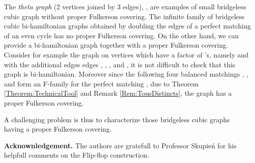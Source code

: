 \documentclass{amsart}
\theoremstyle{definition}
\theoremstyle{remark}
\begin{document}
The {\em theta graph }(2 vertices joined by 3 edges), ,
 are examples of small bridgeless cubic graph without
proper Fulkerson covering. The infinite family of bridgeless cubic
bi-hamiltonian graphs obtained by doubling the edges of a perfect matching of an
even cycle has no proper Fulkerson covering.
On the other hand, we can provide a bi-hamiltonian graph together with a proper
Fulkerson covering. Consider for example the graph  on  vertices which
have a  factor of 's, namely  and  with the additional
edges edges , , ,  and , it is not difficult to check that
this graph is bi-hamiltonian. Moreover since the following four balanced
matchings , ,  and  form an F-family for the
perfect matching , due to Theorem
\ref{Theorem:TechnicalTool} and Remark \ref{Rem:TousDistincts}, the graph 
has a proper Fulkerson covering.


A challenging problem is thus
to characterize those bridgeless cubic graphs having a proper Fulkerson
covering.

{\bf Acknownledgement.} The authors are gratefull to Professor Skupie\'n for his
helpfull comments on the Flip-flop construction.


\end{document}
